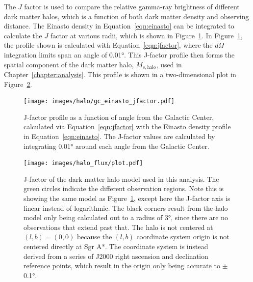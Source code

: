     The $J$ factor is used to compare the relative gamma-ray brightness of different dark matter halos, which is a function of both dark matter density and observing distance.
    The Einasto density in Equation~\ref{eqn:einasto} can be integrated to calculate the $J$ factor at various radii, which is shown in Figure~\ref{fig:gchalo_jfactor}.
    In Figure~\ref{fig:gchalo_jfactor}, the profile shown is calculated with Equation~\ref{eqn:jfactor}, where the $d\Omega$ integration limits span an angle of \ang{0.01}.
    This J-factor profile then forms the spatial component of the dark matter halo, $M_{s,\textrm{halo}}$, used in Chapter~\ref{chapter:analysis}.
    This profile is shown in a two-dimensional plot in Figure~\ref{fig:halojfactor}.
    
    \begin{figure}[!t]
    \centering
      \texttt{[image: images/halo/gc\_einasto\_jfactor.pdf]}
      \caption[Galactic Center Einasto Halo J-Factor]{
        J-factor profile as a function of angle from the Galactic Center, calculated via Equation~\ref{eqn:jfactor} with the Einasto density profile in Equation~\ref{eqn:einasto}.
        The J-factor values are calculated by integrating \ang{0.01} around each angle from the Galactic Center.
      }
      \label{fig:gchalo_jfactor}
    \end{figure}
  
  \begin{figure}[!t]
    \centering
    \texttt{[image: images/halo\_flux/plot.pdf]}
    \caption[Galactic Center Halo J-Factor Sky Map]{
      J-factor of the dark matter halo model used in this analysis.
      The green circles indicate the different observation regions.
      Note this is showing the same model as Figure~\ref{fig:gchalo_jfactor}, except here the J-factor axis is linear instead of logarithmic.
      The black corners result from the halo model only being calculated out to a radius of \ang{3}, since there are no observations that extend past that.
      The halo is not centered at $(l,b)=(0,0)$ because the $(l,b)$ coordinate system origin is not centered directly at Sgr A*.
      The coordinate system is instead derived from a series of J2000 right ascension and declination reference points, which result in the origin only being accurate to $\pm$\ang{0.1}\cite{galacticlb}.
    }
    \label{fig:halojfactor}
  \end{figure}

